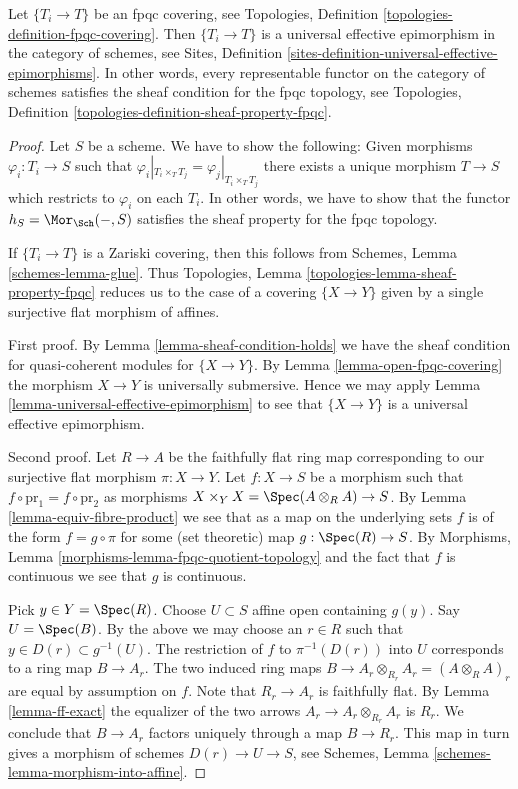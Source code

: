 \begin{lemma}
\label{lemma-fpqc-universal-effective-epimorphisms}
Let $\{T_i \to T\}$ be an fpqc covering, see
Topologies, Definition \ref{topologies-definition-fpqc-covering}.
Then $\{T_i \to T\}$ is a universal effective epimorphism
in the category of schemes, see
Sites, Definition \ref{sites-definition-universal-effective-epimorphisms}.
In other words, every representable functor on the category of schemes
satisfies the sheaf condition for the fpqc topology, see
Topologies, Definition \ref{topologies-definition-sheaf-property-fpqc}.
\end{lemma}

\begin{proof}
Let $S$ be a scheme. We have to show the following:
Given morphisms $\varphi_i : T_i \to S$
such that $\varphi_i|_{T_i \times_T T_j} = \varphi_j|_{T_i \times_T T_j}$
there exists a unique morphism $T \to S$ which restricts
to $\varphi_i$ on each $T_i$.
In other words, we have to show that the functor
$h_S = \Mor_{\Sch}( - , S)$ satisfies
the sheaf property for the fpqc topology.

\medskip\noindent
If $\{T_i \to T\}$ is a Zariski covering, then this follows from
Schemes, Lemma \ref{schemes-lemma-glue}.
Thus Topologies, Lemma \ref{topologies-lemma-sheaf-property-fpqc}
reduces us to the case of a covering $\{X \to Y\}$
given by a single surjective flat morphism of affines.

\medskip\noindent
First proof. By Lemma \ref{lemma-sheaf-condition-holds}
we have the sheaf condition for quasi-coherent modules
for $\{X \to Y\}$. By Lemma \ref{lemma-open-fpqc-covering}
the morphism $X \to Y$ is universally submersive.
Hence we may apply Lemma \ref{lemma-universal-effective-epimorphism}
to see that $\{X \to Y\}$ is a universal effective epimorphism.

\medskip\noindent
Second proof. Let $R \to A$ be the faithfully flat ring map
corresponding to our surjective flat morphism $\pi : X \to Y$.
Let $f : X \to S$ be a morphism
such that $f \circ \text{pr}_1 = f \circ \text{pr}_2$
as morphisms $X \times_Y X = \Spec(A \otimes_R A) \to S$.
By Lemma \ref{lemma-equiv-fibre-product} we see that
as a map on the underlying
sets $f$ is of the form $f = g \circ \pi$ for some
(set theoretic) map $g : \Spec(R) \to S$.
By Morphisms, Lemma \ref{morphisms-lemma-fpqc-quotient-topology}
and the fact that $f$ is continuous we see that $g$
is continuous.

\medskip\noindent
Pick $y \in Y = \Spec(R)$.
Choose $U \subset S$ affine open containing $g(y)$.
Say $U = \Spec(B)$.
By the above we may choose an $r \in R$ such that
$y \in D(r) \subset g^{-1}(U)$.
The restriction of $f$ to $\pi^{-1}(D(r))$ into $U$
corresponds to a ring map $B \to A_r$. The two induced
ring maps $B \to A_r \otimes_{R_r} A_r = (A \otimes_R A)_r$ are equal
by assumption on $f$.
Note that $R_r \to A_r$ is faithfully flat.
By Lemma \ref{lemma-ff-exact} the equalizer of
the two arrows $A_r \to A_r \otimes_{R_r} A_r$ is $R_r$.
We conclude that $B \to A_r$ factors uniquely through a map $B \to R_r$.
This map in turn gives a morphism of schemes $D(r) \to U \to S$,
see Schemes, Lemma \ref{schemes-lemma-morphism-into-affine}.


\end{proof}
